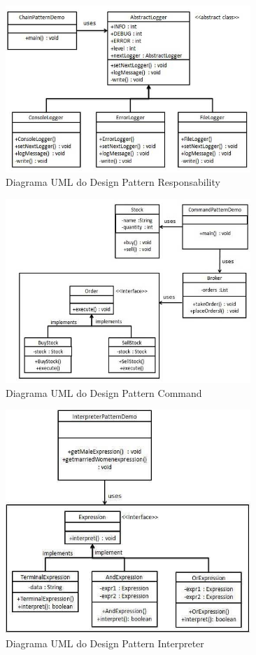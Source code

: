 \begin{figure}[H]
	\centering
	\includegraphics[width = 350px]{figuras/chain_pattern_uml_diagram}
	\caption {Diagrama UML do Design Pattern Responsability}
	\label{fig:dp_responsability}
\end{figure}
\begin{figure}[H]
	\centering
	\includegraphics[width = 350px]{figuras/command_pattern_uml_diagram}
	\caption {Diagrama UML do Design Pattern Command}
	\label{fig:dp_command}
\end{figure}
\begin{figure}[H]
	\centering
	\includegraphics[width = 350px]{figuras/interpreter_pattern_uml_diagram}
	\caption {Diagrama UML do Design Pattern Interpreter}
	\label{fig:dp_interpreter}
\end{figure}
